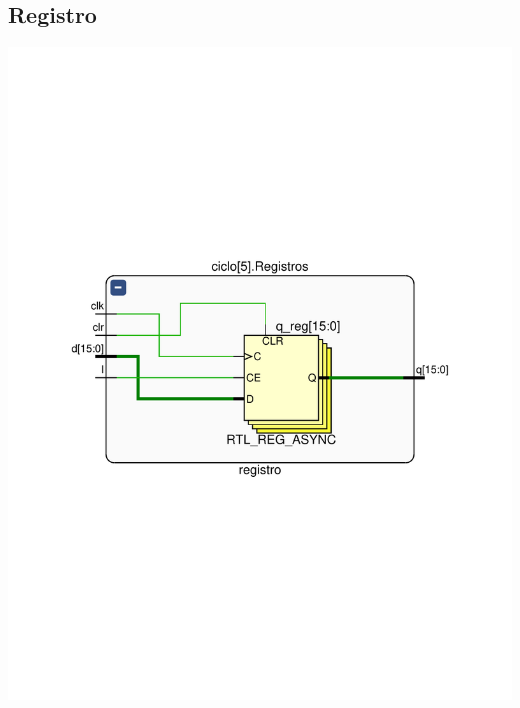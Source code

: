 \documentclass[8pt,executivepaper]{article}
\begin{document}
\subsection{Registro}
\begin{center}
  \includegraphics[scale=0.5]{sources/schematicRegistro.pdf}
\end{center}
\end{document}
